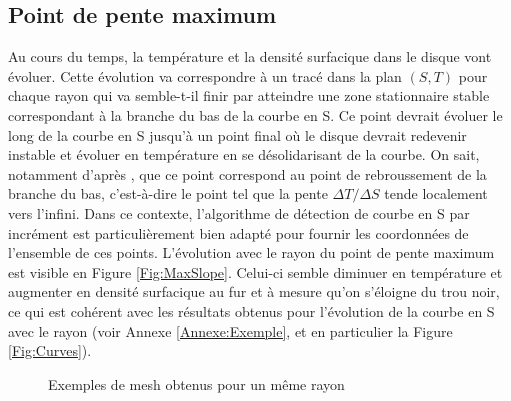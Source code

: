 \documentclass[a4paper,12pt]{article}
\begin{document}
        \subsection{Point de pente maximum}
            Au cours du temps, la température et la densité surfacique dans le disque vont évoluer. Cette évolution va correspondre à un tracé dans la plan $(S,T)$ pour chaque rayon qui va semble-t-il finir par atteindre une zone stationnaire stable correspondant à la branche du bas de la courbe en S. Ce point devrait évoluer le long de la courbe en S jusqu'à un point final où le disque devrait redevenir instable et évoluer en température en se désolidarisant de la courbe. On sait, notamment d'après \cite{PapierAccretion}, que ce point correspond au point de rebroussement de la branche du bas, c'est-à-dire le point tel que la pente $\Delta T / \Delta S$ tende localement vers l'infini.\newline
            Dans ce contexte, l'algorithme de détection de courbe en S par incrément est particulièrement bien adapté pour fournir les coordonnées de l'ensemble de ces points. L'évolution avec le rayon du point de pente maximum est visible en Figure \ref{Fig:MaxSlope}. Celui-ci semble diminuer en température et augmenter en densité surfacique au fur et à mesure qu'on s'éloigne du trou noir, ce qui est cohérent avec les résultats obtenus pour l'évolution de la courbe en S avec le rayon (voir Annexe \ref{Annexe:Exemple}, et en particulier la Figure \ref{Fig:Curves}).




\begin{figure}
  \centering
  \hspace{5pt}
  \caption{Exemples de mesh obtenus pour un même rayon}
\end{figure}
    
\end{document}
